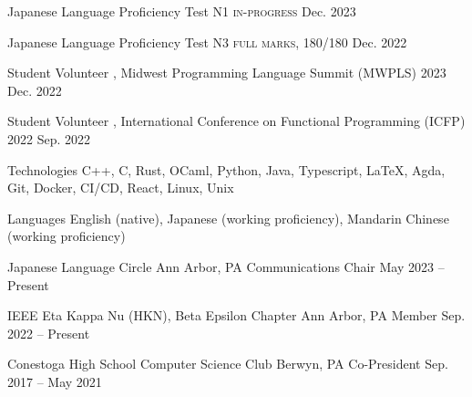 \documentclass[letterpaper,11pt]{article}
\begin{document}
  \begin{rsectionlist}
    \rsectionitemthin
      {Japanese Language Proficiency Test N1}
      { \textsc{in-progress}}
      {Dec. 2023}

    \vspace*{-1em}
    \rsectionitemthin
      {Japanese Language Proficiency Test N3}
      { \textsc{full marks, 180/180}}
      {Dec. 2022}
  \end{rsectionlist}

  \begin{rsectionlist}
    \rsectionitemthin
      {Student Volunteer}
      {, Midwest Programming Language Summit (MWPLS) 2023}
      {Dec. 2022}

    \vspace*{-1em}
    \rsectionitemthin
      {Student Volunteer}
      {, International Conference on Functional Programming (ICFP) 2022}
      {Sep. 2022}
  \end{rsectionlist}

  \begin{rlinelist}
    \rline
      {Technologies}
      {C++, C, Rust, OCaml, Python, Java, Typescript, \LaTeX, Agda,
      Git, Docker, CI/CD, React, Linux, Unix}
      
    \rline
      {Languages}
      {English (native), Japanese (working proficiency), Mandarin Chinese (working proficiency)}
  \end{rlinelist}

  \begin{rsectionlist}
    \rsectionitem
      {Japanese Language Circle}
      {Ann Arbor, PA}
      {Communications Chair}
      {May 2023 -- Present}


    \rsectionitem
      {IEEE Eta Kappa Nu (HKN), Beta Epsilon Chapter}
      {Ann Arbor, PA}
      {Member}
      {Sep. 2022 -- Present}

    
    \rsectionitem
      {Conestoga High School Computer Science Club}
      {Berwyn, PA}
      {Co-President}
      {Sep. 2017 -- May 2021}

  \end{rsectionlist}
\end{document}

